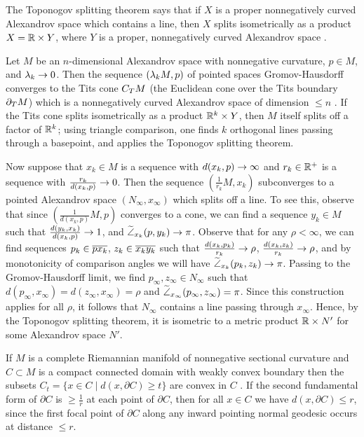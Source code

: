 The Toponogov splitting theorem says that if $X$ is a
proper nonnegatively curved Alexandrov space which contains a line, then $X$
splits isometrically as a product $X={\mathbb R}\times Y$, where
$Y$ is a proper, nonnegatively curved Alexandrov space
\cite[Theorem 10.5.1]{Burago-Burago-Ivanov}.

Let $M$ be an $n$-dimensional Alexandrov space with nonnegative curvature,
$p\in M$,
and $\lambda_k\rightarrow 0$. Then the sequence $(\lambda_kM,p)$ of pointed spaces
Gromov-Hausdorff converges to the Tits cone $C_T M$
(the Euclidean cone over the Tits boundary $\partial_T M$)
which is a nonnegatively curved Alexandrov
space of dimension $\leq n$
\cite[p. 58-59]{Ballmann-Gromov-Schroeder}.
If the Tits cone splits isometrically
as a product ${\mathbb R}^k\times Y$, then $M$ itself splits off
a factor of ${\mathbb R}^k$; using triangle comparison, one finds $k$
orthogonal lines passing through a basepoint, and applies the
Toponogov splitting theorem.

Now suppose that $x_k\in M$ is a sequence with $d(x_k,p)\rightarrow\infty$
and $r_k \in {\mathbb R}^+$  is a sequence with
$\frac{r_k}{d(x_k,p)}\rightarrow 0$.  Then the sequence
$(\frac{1}{r_k} M,x_k)$
subconverges to a pointed Alexandrov
space $(N_\infty,x_\infty)$ which splits off a line.  To see this,
observe that since
$(\frac{1}{d(x_k,p)}M,p)$
converges to a cone,
we can find a
sequence $y_k\in M$ such that $\frac{d(y_k,x_k)}{d(x_k,p)}\rightarrow 1$,
and $\widetilde{\angle}_{x_k}(p,y_k)\rightarrow\pi$.
Observe that for any $\rho<\infty$,
we can find sequences $p_k\in \overline{px_k}$, $z_k\in\overline{x_ky_k}$
such that $\frac{d(x_k,p_k)}{r_k}\rightarrow \rho$,
$\frac{d(x_k,z_k)}{r_k}\rightarrow \rho$, and by monotonicity of comparison
angles
\cite[Chapter 4.3]{Burago-Burago-Ivanov}
we will have $\widetilde{\angle}_{x_k}(p_k,z_k)\rightarrow \pi$.  Passing
to the Gromov-Hausdorff limit, we find $p_\infty, z_\infty\in N_\infty$
such that $d(p_\infty,x_\infty)=d(z_\infty,x_\infty)=\rho$ and
$\widetilde{\angle}_{x_\infty}(p_\infty,z_\infty)=\pi$.  Since this
construction applies for all $\rho$, it follows that $N_\infty$
contains a line passing through $x_\infty$.
Hence, by the Toponogov splitting theorem, it is isometric
to a metric product ${\mathbb R}\times N'$ for some Alexandrov space
$N'$.

If $M$ is a complete Riemannian manifold of nonnegative sectional
curvature and $C\subset M$ is a
compact connected domain with weakly convex boundary then
the subsets $C_t= \{x\in C\mid d(x,\partial C)\geq t\}$
are convex in $C$
\cite[Chapter 8]{Cheeger-Ebin}.
If the second fundamental form of
$\partial C$ is $\geq \frac{1}{r}$ at each point
of $\partial C$, then for all $x\in C$ we have $d(x,\partial C)\leq r$,
since the first focal point of $\partial C$ along any inward pointing
normal geodesic occurs at distance $\leq r$.

